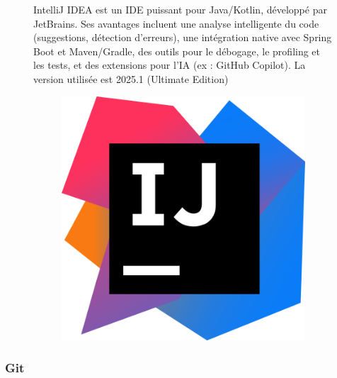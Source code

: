 \documentclass[12pt,a4paper]{report}
\begin{document}
	\begin{figure}[H]
		\begin{minipage}{0.8\textwidth}
			IntelliJ IDEA est un IDE puissant pour Java/Kotlin, développé par JetBrains. Ses avantages incluent une analyse intelligente du code (suggestions, détection d’erreurs), une intégration native avec Spring Boot et Maven/Gradle, des outils pour le débogage, le profiling et les tests, et des extensions pour l’IA (ex : GitHub Copilot). La version utilisée est 2025.1 (Ultimate Edition)
		\end{minipage}
		\hfill
		\begin{minipage}{0.15\textwidth} 
			\begin{figure}[H]
				\centering
				\includegraphics[width=\linewidth]{intellij-logo.png}
				\label{fig:intellij-logo}
			\end{figure}
		\end{minipage}
	\end{figure}
	
	\subsubsection{Git}
	
\end{document}
